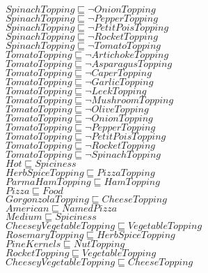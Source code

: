 \documentclass[a4paper,10pt]{article}
\begin{document}
 $SpinachTopping \sqsubseteq  \lnot OnionTopping$\\ 
 $SpinachTopping \sqsubseteq  \lnot PepperTopping$\\ 
 $SpinachTopping \sqsubseteq  \lnot PetitPoisTopping$\\ 
 $SpinachTopping \sqsubseteq  \lnot RocketTopping$\\ 
 $SpinachTopping \sqsubseteq  \lnot TomatoTopping$\\ 
 $TomatoTopping \sqsubseteq  \lnot ArtichokeTopping$\\ 
 $TomatoTopping \sqsubseteq  \lnot AsparagusTopping$\\ 
 $TomatoTopping \sqsubseteq  \lnot CaperTopping$\\ 
 $TomatoTopping \sqsubseteq  \lnot GarlicTopping$\\ 
 $TomatoTopping \sqsubseteq  \lnot LeekTopping$\\ 
 $TomatoTopping \sqsubseteq  \lnot MushroomTopping$\\ 
 $TomatoTopping \sqsubseteq  \lnot OliveTopping$\\ 
 $TomatoTopping \sqsubseteq  \lnot OnionTopping$\\ 
 $TomatoTopping \sqsubseteq  \lnot PepperTopping$\\ 
 $TomatoTopping \sqsubseteq  \lnot PetitPoisTopping$\\ 
 $TomatoTopping \sqsubseteq  \lnot RocketTopping$\\ 
 $TomatoTopping \sqsubseteq  \lnot SpinachTopping$\\ 
 $Hot \sqsubseteq Spiciness$\\ 
 $HerbSpiceTopping \sqsubseteq PizzaTopping$\\ 
 $ParmaHamTopping \sqsubseteq HamTopping$\\ 
 $Pizza \sqsubseteq Food$\\ 
 $GorgonzolaTopping \sqsubseteq CheeseTopping$\\ 
 $American \sqsubseteq NamedPizza$\\ 
 $Medium \sqsubseteq Spiciness$\\ 
 $CheeseyVegetableTopping \sqsubseteq VegetableTopping$\\ 
 $RosemaryTopping \sqsubseteq HerbSpiceTopping$\\ 
 $PineKernels \sqsubseteq NutTopping$\\ 
 $RocketTopping \sqsubseteq VegetableTopping$\\ 
 $CheeseyVegetableTopping \sqsubseteq CheeseTopping$\\ 
\end{document}
